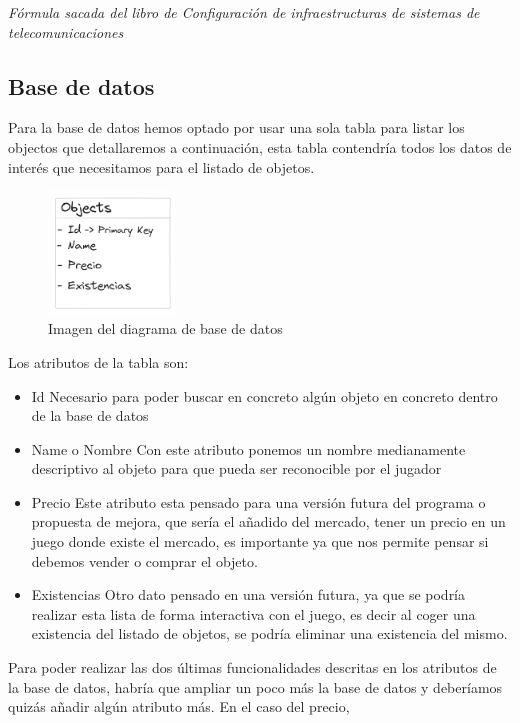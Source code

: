 \documentclass[a4paper]{article}
\begin{document}
\begin{flushright}
    \textit{Fórmula sacada del libro de Configuración de infraestructuras de sistemas de telecomunicaciones}
\end{flushright}
\clearpage
\subsection{Base de datos}
Para la base de datos hemos optado por usar una sola tabla para listar los objectos que detallaremos a continuación, esta tabla contendría todos los datos de interés que necesitamos para el listado de objetos.\\
\begin{figure}[!ht]
    \centering
    \includegraphics[width=0.3\textwidth]{Images/entidadRelacionBaseDeDatos.PNG}
    \caption{Imagen del diagrama de base de datos}
    \label{fig:diagramaBasededatos}
\end{figure}
Los atributos de la tabla son:
\begin{itemize}
    \item Id
          Necesario para poder buscar en concreto algún objeto en concreto dentro de la base de datos
    \item Name o Nombre
          Con este atributo ponemos un nombre medianamente descriptivo al objeto para que pueda ser reconocible por el jugador
    \item Precio
          Este atributo esta pensado para una versión futura del programa o propuesta de mejora, que sería el añadido del mercado, tener un precio en un juego donde existe el mercado, es importante ya que nos permite pensar si debemos vender o comprar el objeto.
    \item Existencias
          Otro dato pensado en una versión futura, ya que se podría realizar esta lista de forma interactiva con el juego, es decir al coger una existencia del listado de objetos, se podría eliminar una existencia del mismo.
\end{itemize}
Para poder realizar las dos últimas funcionalidades descritas en los atributos de la base de datos, habría que ampliar un poco más la base de datos y deberíamos quizás añadir algún atributo más. En el caso del precio,
\end{document}
